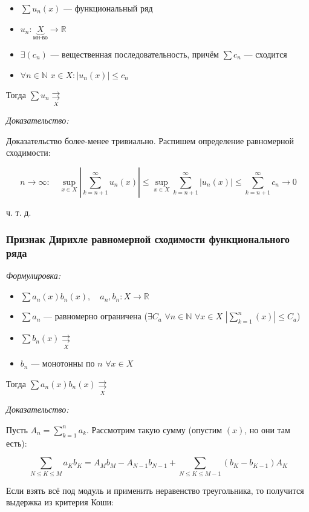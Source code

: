 \documentclass{article}
\def\dbl{\,\,}
\def\rsh#1{\underset{#1}{\rightrightarrows}}
\begin{document}
\begin{itemize}
    \item $\sum u_n(x)$ --- функциональный ряд
    \item $u_n: \underbrace{X}_{\text{мн-во}} \rightarrow \mathbb{R}$
    \item $\exists (c_n)$ --- вещественная последовательность, причём $\sum c_n$ --- сходится
    \item $\forall n \in \mathbb{N} \dbl x \in X: |u_n(x)| \le c_n$
\end{itemize}

Тогда $\sum u_n \rsh{X}$

\textit{Доказательство:}

Доказательство более-менее тривиально. Распишем определение равномерной сходимости:

\[n \rightarrow \infty: \quad \sup_{x \in X} \left| \sum_{k = n + 1}^{\infty} u_n(x) \right| \le \sup_{x \in X} \sum_{k = n + 1}^{\infty} \left| u_n(x) \right| \le \sum_{k = n + 1}^{\infty} c_n \longrightarrow 0\]

ч. т. д.

\subsubsection{Признак Дирихле равномерной сходимости функционального ряда}
\textit{Формулировка:}

\begin{itemize}
    \item $\sum a_n(x) b_n(x), \quad a_n, b_n: X \rightarrow \mathbb{R}$
    \item $\sum a_n$ --- равномерно ограничена ($\exists C_a \dbl \forall n \in \mathbb{N} \dbl \forall x \in X \dbl \left|\sum_{k = 1}^{n}(x)\right| \le C_a$)
    \item $\sum b_n(x) \rsh{X}$
    \item $b_n$ --- монотонны по $n \dbl \forall x \in X$
\end{itemize}

Тогда $\sum a_n(x) b_n(x) \rsh{X}$

\textit{Доказательство:}

Пусть $A_n = \sum_{k = 1}^n a_k$. Рассмотрим такую сумму (опустим $(x)$, но они там есть): 

\[
    \sum_{N \le K \le M} {a_K b_K} = A_Mb_M - A_{N - 1}b_{N - 1} + \sum_{N \le K \le M - 1} {(b_K - b_{K - 1})A_K}
\]

Если взять всё под модуль и применить неравенство треугольника, то получится выдержка из критерия Коши: 
\end{document}
